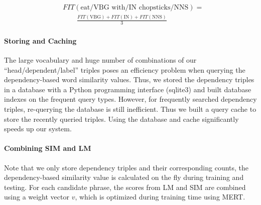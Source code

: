 \documentclass[11pt]{article}
\begin{document}
\begin{align}
& FIT(\mbox{eat/VBG with/IN chopsticks/NNS}) = \nonumber \\
 & \qquad \frac{FIT(\mbox{VBG}) + FIT(\mbox{IN}) + FIT(\mbox{NNS})}{3} 
\end{align}



\paragraph{Storing and Caching}
The large vocabulary and huge number of combinations of our ``head/dependent/label'' triples poses an efficiency problem when querying the dependency-based word similarity values. Thus, we stored the dependency triples in a database with a Python programming interface (sqlite3) and built database indexes on the frequent query types. However, for frequently searched dependency triples, re-querying the database is still inefficient. Thus we built a query cache to store the recently queried triples. Using the database and cache significantly speeds up our system. 


\paragraph{Combining SIM and LM}
Note that we only store dependency triples and their corresponding counts, the dependency-based similarity value is calculated on the fly during training and testing. For each candidate phrase, the scores from LM and SIM are combined using a weight vector $v$, which is optimized during training time using MERT. 


\end{document}
